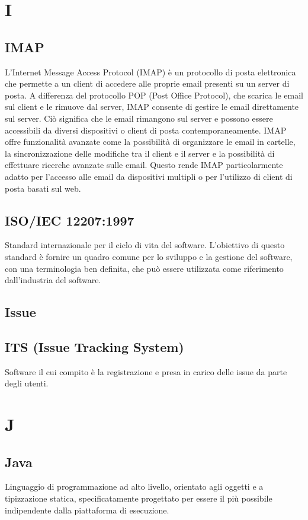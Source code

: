 \documentclass[12pt]{article}
\begin{document}
	\clearpage
	\section{I}
		\subsection{IMAP}
		L'Internet Message Access Protocol (IMAP) è un protocollo di posta elettronica che permette a un client di accedere alle proprie email presenti su un server di posta. A differenza del protocollo POP (Post Office Protocol), che scarica le email sul client e le rimuove dal server, IMAP consente di gestire le email direttamente sul server. Ciò significa che le email rimangono sul server e possono essere accessibili da diversi dispositivi o client di posta contemporaneamente. IMAP offre funzionalità avanzate come la possibilità di organizzare le email in cartelle, la sincronizzazione delle modifiche tra il client e il server e la possibilità di effettuare ricerche avanzate sulle email. Questo rende IMAP particolarmente adatto per l'accesso alle email da dispositivi multipli o per l'utilizzo di client di posta basati sul web.
		\subsection{ISO/IEC 12207:1997}
		Standard internazionale per il ciclo di vita del software. L'obiettivo di questo standard è fornire un quadro comune per lo sviluppo e la gestione del software, con una terminologia ben definita, che può essere utilizzata come riferimento dall'industria del software.

		\subsection{Issue}
		

		\subsection{ITS (Issue Tracking System)}
		Software il cui compito è la registrazione e presa in carico delle issue da parte degli utenti.
	\clearpage
	\section{J}
		\subsection{Java}
		Linguaggio di programmazione ad alto livello, orientato agli oggetti e a tipizzazione statica, specificatamente progettato per essere il più possibile indipendente dalla piattaforma di esecuzione.
\end{document}
